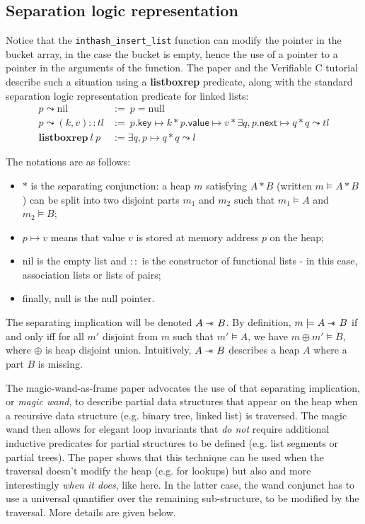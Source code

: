 \documentclass[11pt]{article}
\def\ce{\lstinline[language=C, breaklines=true, columns=fixed]}
\newcommand{\wand}{-\kern-.6em\raisebox{-.659ex}{*}\ } %
\begin{document}
{\subsection{Separation logic representation}

Notice that the \ce{inthash_insert_list} function can modify the pointer in the bucket array, in the case the bucket is empty, hence the use of a pointer to a pointer in the arguments of the function. The paper and the Verifiable C tutorial describe such a situation using a \textbf{listboxrep} predicate, along with the standard separation logic representation predicate for linked lists:
\[ \begin{array}{ll}
  p \leadsto \mathrm{nil} & :=\ p = \mathrm{null}\\
  p \leadsto (k, v)::\mathit{tl} & :=\ p.\mathsf{key} \mapsto k * p.\mathsf{value} \mapsto v * \exists q, p.\mathsf{next} \mapsto q * q \leadsto \mathit{tl}\\[.3cm]
  \mathbf{listboxrep}\ l\ p & := \exists q, p \mapsto q * q \leadsto l \end{array} \]

The notations are as follows:
\begin{itemize}[noitemsep, topsep=0pt]
  \item $*$ is the separating conjunction: a heap $m$ satisfying $A * B$ (written $m \models A * B$) can be split into two disjoint parts $m_1$ and $m_2$ such that $m_1 \models A$ and $m_2 \models B$;
  \item $p \mapsto v$ means that value $v$ is stored at memory address $p$ on the heap; 
  \item $\mathrm{nil}$ is the empty list and $::$ is the constructor of functional lists - in this case, association lists or lists of pairs;
  \item finally, $\mathrm{null}$ is the null pointer.
\end{itemize}

The separating implication will be denoted $A \wand B$. By definition, $m \models A \wand B$ if and only iff for all $m'$ disjoint from $m$ such that $m' \models A$, we have $m \oplus m' \models B$, where $\oplus$ is heap disjoint union. Intuitively, $A \wand B$ describes a heap $A$ where a part $B$ is missing. 

The magic-wand-as-frame paper advocates the use of that separating implication, or \emph{magic wand}, to describe partial data structures that appear on the heap when a recursive data structure (e.g. binary tree, linked list) is traversed.  The magic wand then allows for elegant loop invariants that \emph{do not} require additional inductive predicates for partial structures to be defined (e.g. list segments or partial trees). The paper shows that this technique can be used when the traversal doesn't modify the heap (e.g. for lookups) but also and more interestingly \emph{when it does}, like here. In the latter case, the wand conjunct has to use a universal quantifier over the remaining sub-structure, to be modified by the traversal. More details are given below.

}
\end{document}
